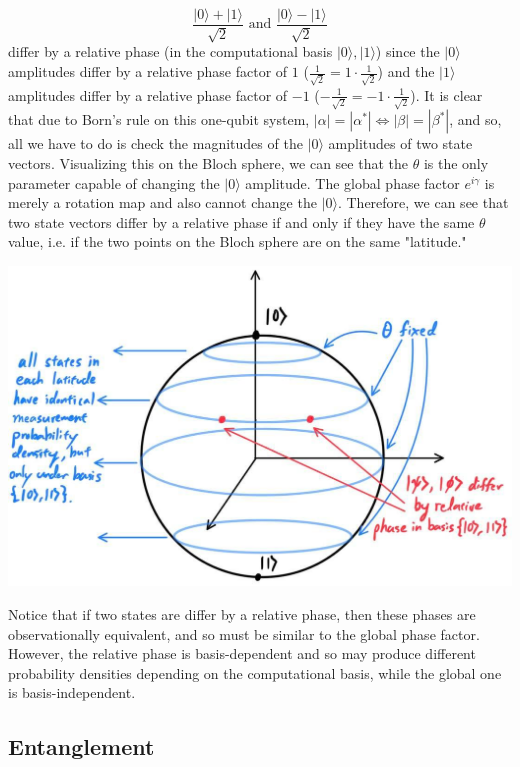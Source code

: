 \documentclass{article}
\begin{document}
    \[\frac{|0\rangle + |1\rangle}{\sqrt{2}} \text{ and } \frac{|0\rangle - |1\rangle}{\sqrt{2}}\]
    differ by a relative phase (in the computational basis $|0\rangle, |1\rangle$) since the $|0\rangle$ amplitudes differ by a relative phase factor of $1$ ($ \frac{1}{\sqrt{2}} = 1 \cdot \frac{1}{\sqrt{2}}$) and the $|1\rangle$ amplitudes differ by a relative phase factor of $-1$ ($-\frac{1}{\sqrt{2}} = -1 \cdot \frac{1}{\sqrt{2}}$). It is clear that due to Born's rule on this one-qubit system, $|\alpha| = |\alpha^*| \iff |\beta| = |\beta^*|$, and so, all we have to do is check the magnitudes of the $|0\rangle$ amplitudes of two state vectors. Visualizing this on the Bloch sphere, we can see that the $\theta$ is the only parameter capable of changing the $|0\rangle$ amplitude. The global phase factor $e^{i\gamma}$ is merely a rotation map and also cannot change the $|0\rangle$. Therefore, we can see that two state vectors differ by a relative phase if and only if they have the same $\theta$ value, i.e. if the two points on the Bloch sphere are on the same "latitude."

    \begin{center} 
      \includegraphics[scale=0.3]{img/Bloch_Sphere_latitude.jpg}
    \end{center}

    Notice that if two states are differ by a relative phase, then these phases are observationally equivalent, and so must be similar to the global phase factor. However, the relative phase is basis-dependent and so may produce different probability densities depending on the computational basis, while the global one is basis-independent. 

  \subsection{Entanglement}
\end{document}

